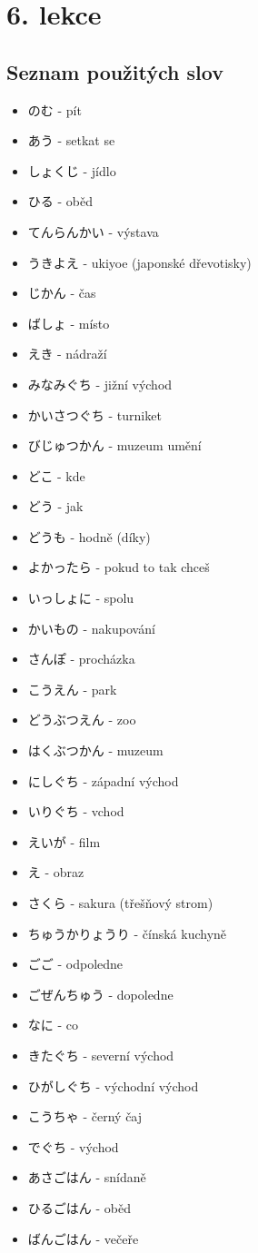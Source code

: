 \section{6. lekce}

\subsection*{Seznam použitých slov}

\begin{itemize}
    \item のむ - pít
    \item あう - setkat se
    \item しょくじ - jídlo
    \item ひる - oběd
    \item てんらんかい - výstava
    \item うきよえ - ukiyoe (japonské dřevotisky)
    \item じかん - čas
    \item ばしょ - místo
    \item えき - nádraží
    \item みなみぐち - jižní východ
    \item かいさつぐち - turniket
    \item びじゅつかん - muzeum umění
    \item どこ - kde
    \item どう - jak
    \item どうも - hodně (díky)
    \item よかったら - pokud to tak chceš
    \item いっしょに - spolu
    \item かいもの - nakupování
    \item さんぽ - procházka
    \item こうえん - park
    \item どうぶつえん - zoo
    \item はくぶつかん - muzeum
    \item にしぐち - západní východ
    \item いりぐち - vchod
    \item えいが - film
    \item え - obraz
    \item さくら - sakura (třešňový strom)
    \item ちゅうかりょうり - čínská kuchyně
    \item ごご - odpoledne
    \item ごぜんちゅう - dopoledne
    \item なに - co
    \item きたぐち - severní východ
    \item ひがしぐち - východní východ
    \item こうちゃ - černý čaj
    \item でぐち - východ
    \item あさごはん - snídaně
    \item ひるごはん - oběd
    \item ばんごはん - večeře
\end{itemize}

